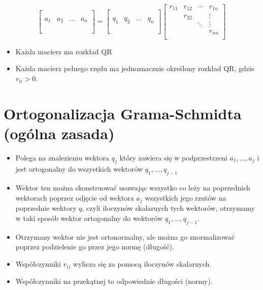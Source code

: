 \documentclass[a4paper]{article}
\begin{document}
\begin{equation*}
    \begin{bmatrix}
        & & & \\
        & & & \\
        a_1 & a_2 & \dots & a_n \\
        & & & \\
        & & & \\
    \end{bmatrix}
    =
    \begin{bmatrix}
        & & & \\
        & & & \\
        q_1 & q_2 & \dots & q_n \\
        & & & \\
        & & & \\
    \end{bmatrix}
    \begin{bmatrix}
        r_{11} & r_{12} & \cdots & r_{1n} \\
        & r_{22} & & \vdots \\
        & & \ddots & \vdots \\
        & & & r_{nn} \\
    \end{bmatrix}
\end{equation*}

\begin{itemize}
    \item Każda macierz ma rozkład QR
    \item Każda macierz pełnego rzędu ma jednoznacznie określony rozkład QR, gdzie $r_{ii} > 0$.
\end{itemize}

\section{Ortogonalizacja Grama-Schmidta (ogólna zasada)}

\begin{itemize}
    \item Polega na znalezieniu wektora $q_j$ który zawiera się w podprzestrzeni $a_1, \dots , a_j$ i jest ortogonalny do wszystkich wektorów $q_1, \dots , q_{j-1}$
    \item Wektor ten można skonstruować usuwając wszystko co leży na poprzednich wektorach poprzez odjęcie od wektora $a_j$ wszystkich jego rzutów na poprzednie wektory $q$, czyli iloczynów skalarnych tych wektorów, otrzymamy w taki sposób wektor ortogonalny do wektorów $q_1, \dots , q_{j-1}$.
    \item Otrzymany wektor nie jest ortonormalny, ale można go znormalizować poprzez podzielenie go przez jego normę (długość).
    \item Współczynniki $r_{ij}$ wylicza się za pomocą iloczynów skalarnych.
    \item Współczynniki na przekątnej to odpowiednie długości (normy).
\end{itemize}
\end{document}
